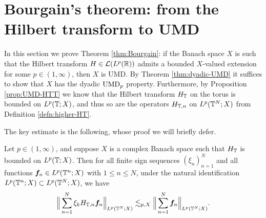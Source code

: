 \section{Bourgain's theorem: from the Hilbert transform to UMD}

In this section we prove Theorem \ref{thm:Bourgain}: if the Banach space $X$ is such that the Hilbert transform $H \in \mathcal{L}(L^p(\mathbb{R}))$ admits a bounded $X$-valued extension for some $p \in (1,\infty)$, then $X$ is UMD.
By Theorem \ref{thm:dyadic-UMD} it suffices to show that $X$ has the dyadic $\mathrm{UMD}_{p}$ property.
Furthermore, by Proposition \ref{prop:UMD-HTT} we know that the Hilbert transform $H_{\mathbb{T}}$ on the torus is bounded on $L^p(\mathbb{T};X)$, and thus so are the operators $H_{\mathbb{T},n}$ on $L^p(\mathbb{T}^{N};X)$ from Definition \ref{defn:higher-HT}.

The key estimate is the following, whose proof we will briefly defer.
\begin{prop}\label{prop:Bourgain-H}
  Let $p \in (1,\infty)$, and suppose $X$ is a complex Banach space such that $H_{\mathbb{T}}$ is bounded on $L^p(\mathbb{T};X)$.
  Then for all finite sign sequences $(\xi_{n})_{n=1}^{N}$ and all functions $\bm{f}_{n} \in L^p(\mathbb{T}^{n};X)$ with $1 \leq n \leq N$, under the natural identification $L^p(\mathbb{T}^{n};X) \subset L^p(\mathbb{T}^{N};X)$, we have
  \begin{equation*}
    \Big\| \sum_{n=1}^{N} \xi_{k} H_{\mathbb{T},n} \bm{f}_{n} \Big\|_{L^p(\mathbb{T}^{N};X)} \lesssim_{p,X} \Big\| \sum_{n=1}^{N} \bm{f}_{n} \Big\|_{L^p(\mathbb{T}^{N};X)}.
  \end{equation*}
\end{prop}


